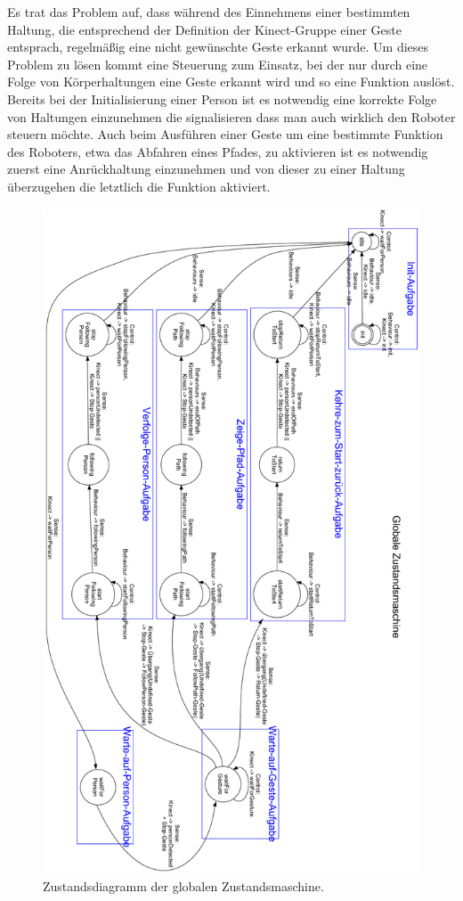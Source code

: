 Es trat das Problem auf, dass während des Einnehmens einer bestimmten Haltung, die entsprechend der Definition 
der Kinect-Gruppe einer Geste entsprach, regelmäßig eine nicht gewünschte Geste erkannt wurde. Um dieses Problem 
zu lösen kommt eine Steuerung zum Einsatz, bei der nur durch eine Folge von Körperhaltungen eine Geste erkannt 
wird und so eine Funktion auslöst. Bereits bei der Initialisierung einer Person ist es notwendig eine korrekte 
Folge von Haltungen einzunehmen die signalisieren dass man auch wirklich den Roboter steuern möchte. Auch beim 
Ausführen einer Geste um eine bestimmte Funktion des Roboters, etwa das Abfahren eines Pfades, zu aktivieren ist 
es notwendig zuerst eine Anrückhaltung einzunehmen und von dieser zu einer Haltung überzugehen die letztlich die 
Funktion aktiviert.

\begin{figure}
	\label{fig:integration_statemachine}
	\includegraphics[scale=0.43]{graphics/SCHEMA-GlobalStateMachine-hk.pdf}
	\caption{Zustandsdiagramm der globalen Zustandsmaschine.}
\end{figure}


